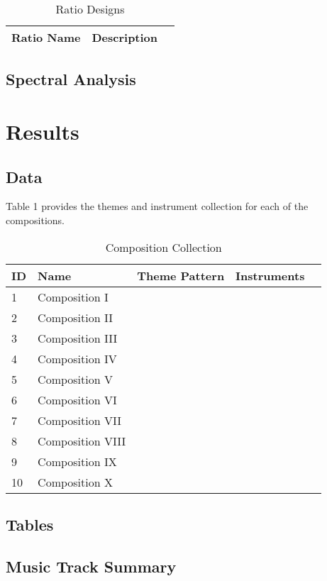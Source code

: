 \begin{table}[H]
	\caption{Ratio Designs}	
	\begin{tabular}{p{3cm}p{4cm}p{1cm}}
	\hline
	Ratio Name & Description & \\
	\hline 
	\end{tabular}
\end{table}

\subsection{Spectral Analysis}


\section{Results}

\subsection{Data}

Table 1 provides the themes and instrument collection for each of the compositions.
	
\begin{table}[H]
\caption{Composition Collection}	
\begin{tabular}{p{1cm}p{4cm}p{2cm}p{1cm}p{1cm}}
\hline
ID & Name & Theme Pattern & Instruments & \\
\hline 
1 & Composition I &  &  & \\
2 & Composition II &  &  & \\
3 & Composition III &  & \\
4 & Composition IV & & \\
5 & Composition V & & & \\
\hline 
6 & Composition VI &  &  & \\
7 & Composition VII &  &  & \\
8 & Composition VIII &  & \\
9 & Composition IX & & \\
10 & Composition X & & & \\
\end{tabular}
\end{table}

\subsection{Tables}

\subsection{Music Track Summary}

